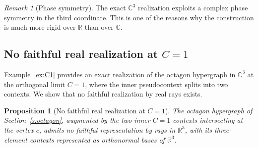 \documentclass[
  twocolumn,
  aps,
  pra,
  floatfix,
  amsmath,amssymb,
  longbibliography
]{revtex4-2}
\newtheorem{proposition}[theorem]{Proposition}
\theoremstyle{definition}
\theoremstyle{remark}
\newtheorem{remark}[theorem]{Remark}
\begin{document}
\begin{remark}[Phase symmetry]
The exact \(\mathbb C^3\) realization exploits a complex phase
symmetry in the third coordinate.  This is one of the reasons why the
construction is much more rigid over \(\mathbb R\) than over
\(\mathbb C\).
\end{remark}





\subsection{No faithful real realization at \texorpdfstring{$C=1$}{C=1}}
\label{app:real}

Example~\ref{ex:C1} provides an exact realization of the octagon hypergraph in \(\mathbb{C}^3\) at the orthogonal limit \(C=1\), where the inner pseudocontext splits into two contexts. We show that no faithful realization by real rays exists.

\begin{proposition}[No faithful real realization at \(C=1\)]
\label{prop:no_real_C1}
The octagon hypergraph of Section~\ref{s:octagon}, augmented by the two inner \(C=1\) contexts intersecting at the vertex \(c\), admits no faithful representation by rays in \(\mathbb{R}^3\), with its three-element contexts represented as orthonormal bases of \(\mathbb{R}^3\).
\end{proposition}
\end{document}
